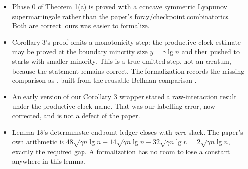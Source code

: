 \documentclass[11pt]{article}
\theoremstyle{erratumstyle}
\newcommand{\lgn}{\lg n}
\begin{document}
\begin{itemize}
\item Phase 0 of Theorem 1(a) is proved with a concave symmetric Lyapunov
  supermartingale rather than the paper's foray/checkpoint combinatorics. Both
  are correct; ours was easier to formalize.
\item Corollary 3's proof omits a monotonicity step: the productive-clock
  estimate may be proved at the boundary minority size $y=\gamma\lg n$ and
  then pushed to starts with smaller minority. This is a true omitted step, not
  an erratum, because the statement remains correct. The formalization records
  the missing comparison as
  , built from
  the reusable Bellman comparison
  .
\item An early version of our Corollary 3 wrapper stated a raw-interaction
  result under the productive-clock name. That was our labelling error, now
  corrected, and is not a defect of the paper.

\item Lemma 18's deterministic endpoint ledger closes with
  \emph{zero} slack. The paper's own arithmetic is
  $48\sqrt{\gamma n\lgn} - 14\sqrt{\gamma n\lgn} - 32\sqrt{\gamma n\lgn}
   = 2\sqrt{\gamma n\lgn}$,
  exactly the required gap. A formalization has no room to lose a constant
  anywhere in this lemma.
\end{itemize}
\end{document}
